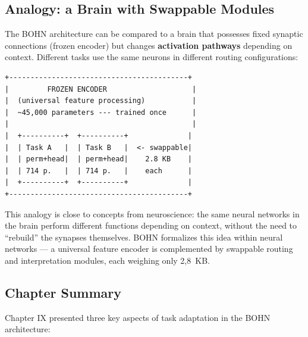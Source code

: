 \documentclass[11pt,a4paper]{report}
\begin{document}
\subsection{Analogy: a Brain with Swappable Modules}

The BOHN architecture can be compared to a brain that possesses fixed synaptic connections (frozen encoder) but changes \textbf{activation pathways} depending on context. Different tasks use the same neurons in different routing configurations:

\begin{verbatim}
+------------------------------------------+
|         FROZEN ENCODER                    |
|  (universal feature processing)           |
|  ~45,000 parameters --- trained once      |
|                                           |
|  +----------+  +----------+              |
|  | Task A   |  | Task B   |  <- swappable|
|  | perm+head|  | perm+head|    2.8 KB    |
|  | 714 p.   |  | 714 p.   |    each      |
|  +----------+  +----------+              |
+------------------------------------------+
\end{verbatim}

This analogy is close to concepts from neuroscience: the same neural networks in the brain perform different functions depending on context, without the need to ``rebuild'' the synapses themselves. BOHN formalizes this idea within neural networks --- a universal feature encoder is complemented by swappable routing and interpretation modules, each weighing only 2{,}8~KB.


\subsection*{Chapter Summary}

Chapter IX presented three key aspects of task adaptation in the BOHN architecture:
\end{document}
